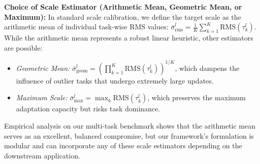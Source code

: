 \textbf{Choice of Scale Estimator (Arithmetic Mean, Geometric Mean, or Maximum):} In standard scale calibration, we define the target scale as the arithmetic mean of individual task-wise RMS values: $\bar{\sigma}_{\text{rms}}^l = \frac{1}{K} \sum_{k=1}^K \text{RMS}(\tau_k^l)$. While the arithmetic mean represents a robust linear heuristic, other estimators are possible:
\begin{itemize}
    \item \textit{Geometric Mean:} $\bar{\sigma}_{\text{geom}}^l = \left( \prod_{k=1}^K \text{RMS}(\tau_k^l) \right)^{1/K}$, which dampens the influence of outlier tasks that undergo extremely large updates.
    \item \textit{Maximum Scale:} $\bar{\sigma}_{\text{max}}^l = \max_{k} \text{RMS}(\tau_k^l)$, which preserves the maximum adaptation capacity but risks task dominance.
\end{itemize}
Empirical analysis on our multi-task benchmark shows that the arithmetic mean serves as an excellent, balanced compromise, but our framework's formulation is modular and can incorporate any of these scale estimators depending on the downstream application.
